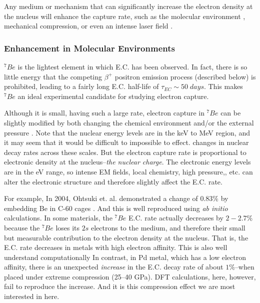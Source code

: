 \documentclass[%
 aip,
 jmp,%
 amsmath,amssymb,
 reprint,%
]{revtex4-1}
\begin{document}
Any medium or mechanism that can significantly increase the electron density at the nucleus will enhance the capture rate, such as the molecular environment \cite{emery, ohtsuki,1999EPSL171325H,wang,PhysRevC.71.025801}, mechanical compression\cite{PhysRevC.101.035801}, or even an intense laser field \cite{sato}.

\subsubsection{Enhancement in Molecular Environments}

$^{7}Be$ is the  lightest element in which E.C. has been observed.  In fact, there is so little energy that the competing $\beta^{+}$ positron emission process (described below) is prohibited, leading to a fairly long E.C. half-life of $\tau_{EC}\sim 50\;days$.  This makes $^{7}Be$ an ideal experimental candidate for studying electron capture.

Although it is small,  having such a large rate, electron capture in $^{7}Be$ can be slightly modified  by both changing the chemical environment and/or the external pressure \cite{Segre021947, emery,wang,PhysRevC.71.025801,ohtsuki}. Note that the nuclear energy levels are in the keV to MeV region, and it may seem that it would be difficult to impossible to effect. changes in nuclear decay rates across these scales.  But the electron capture rate is proportional to electronic density at the nucleus--\emph{the nuclear charge}.  
 The electronic energy levels are in the eV range, so intense EM fields, local chemistry, high pressure,, etc. can alter the electronic structure and therefore slightly affect the E.C. rate. 

For example, In 2004, Ohtsuki et. al. demonstrated a change of $0.83\%$  by embedding Be in C-60 cages \cite{ohtsuki}.  And this is well reproduced using \emph{ab initio} calculations.  In some materials, the $^{7}Be$ E.C. rate actually decreases by $2-2.7\%$ because the $^{7}Be$ loses its $2s$ electrons to the medium,\cite{PhysRevC.71.025801} and therefore their small but measurable contribution to the electron density at the nucleus. That is, the E.C. rate decreases in metals with high electron affinity. This is also well understand computationally  In contrast, in Pd metal, which has a low electron affinity, there is an unexpected \emph{increase} in the E.C. decay rate of about $1\%$--when placed under extreme compression (25–40 GPa).\cite{PhysRevC.101.035801}  DFT calculations, here, however, fail to reproduce the increase.  And it is this compression effect we are most interested in here.
\end{document}
